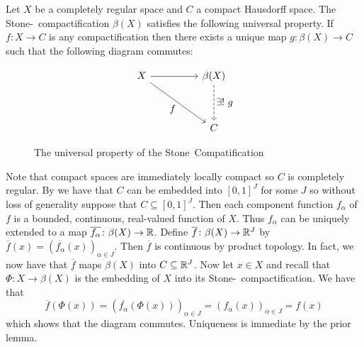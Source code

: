 \documentclass[letterpaper, 11pt, oneside]{book}
\begin{document}
\begin{prop}
  Let $X$ be a completely regular space and $C$ a compact Hausdorff space.
  The Stone-\Cech\ compactification $\beta(X)$ satisfies the following universal property.
  If $f\colon X \to C$ is any compactification then there exists a unique map $g\colon\beta(X) \to C$ such that the following diagram commutes:
  \begin{figure}[h]
    \centering
    \[
      \begin{tikzcd}[every label/.append style={font=\normalsize}]
        X && {\beta(X)} \\
        \\
        && C
        \arrow[from=1-1, to=1-3]
        \arrow["{\exists!~g}", dashed, from=1-3, to=3-3]
        \arrow["f"', from=1-1, to=3-3]
      \end{tikzcd}
    \]
    \caption{The universal property of the Stone\Cech\ Compatification}\label{fig:stone-cech-univ}
  \end{figure}
\end{prop}
\begin{pf}
  Note that compact spaces are immediately locally compact  so $C$ is completely regular.
  By  we have that $C$ can be embedded into $[0, 1]^{J}$ for some $J$ so without loss of generality suppose that $C \subseteq [0, 1]^{J}$.
  Then each component function $f_{\alpha}$ of $f$ is a bounded, continuous, real-valued function of $X$.
  Thus $f_{\alpha}$ can be uniquely extended to a map $\overline{f_{\alpha}}\colon \beta(X) \to \mathbb{R}$.
  Define $\overline{f}\colon \beta(X) \to \mathbb{R}^{J}$ by $\overline{f}(x) = (\overline{f_{\alpha}}(x))_{\alpha \in J}$.
  Then $\overline{f}$ is continuous by product topology.
  In fact, we now have that $\overline{f}$ maps $\beta(X)$ into $C \subseteq \mathbb{R}^{J}$.
  Now let $x \in X$ and recall that $\Phi\colon X \to \beta(X)$ is the embedding of $X$ into its Stone-\Cech\ compactification.
  We have that
  \[
    \overline{f}(\Phi(x)) = (\overline{f_{\alpha}}(\Phi(x)))_{\alpha \in J} = (f_{\alpha}(x))_{\alpha \in J} = f(x)
  \]
  which shows that the diagram  commutes.
  Uniqueness is immediate by the prior lemma.
\end{pf}

\clearpage
\end{document}
